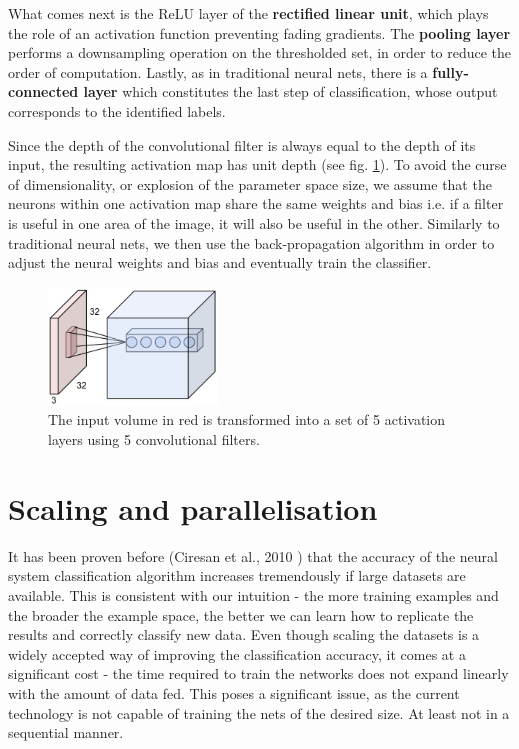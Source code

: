 \documentclass[a4paper, 11pt]{article}
\numberwithin{equation}{section}
\begin{document}
	What comes next is the ReLU layer of the \textbf{rectified linear unit}, which plays the role of an activation function preventing fading gradients. 
	The \textbf{pooling layer} performs a downsampling operation on the thresholded set, in order to reduce the order of computation.
	Lastly, as in traditional neural nets, there is  a \textbf{fully-connected layer} which constitutes the last step of classification, whose output corresponds to the identified labels.
	
	Since the depth of the convolutional filter is always equal to the depth of its input, the resulting activation map has unit depth (see fig. \ref{fig:conv_net}). To avoid the curse of dimensionality, or explosion of the parameter space size, we assume that the neurons within one activation map share the same weights and bias i.e. if a filter is useful in one area of the image, it will also be useful in the other. Similarly to traditional neural nets, we then use the back-propagation algorithm in order to adjust the neural weights and bias and eventually train the classifier.
	
	\begin{figure}[!h]
		\centering
		\includegraphics[page=1,width=0.40\textwidth]{depthcol.jpeg}
		\caption{\label{fig:conv_net}{The input volume in red is transformed into a set of 5 activation layers using 5 convolutional filters.}}
	\end{figure} 
	
	\section{Scaling and parallelisation}
	
	It has been proven before (Ciresan et al., 2010 \cite{ciresan2010deep}) that the accuracy of the neural system classification algorithm increases tremendously if large datasets are available. This is consistent with our intuition - the more training examples and the broader the example space, the better we can learn how to replicate the results and correctly classify new data. Even though scaling the datasets is a widely accepted way of improving the classification accuracy, it comes at a significant cost - the time required to train the networks does not expand linearly with the amount of data fed. This poses a significant issue, as the current technology is not capable of training the nets of the desired size. At least not in a sequential manner.
	
\end{document}
